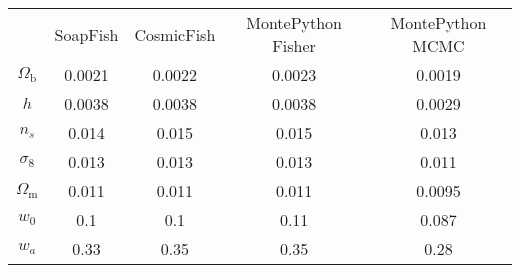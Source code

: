 \begin{table}
\centering
\begin{tabular}{|c|c|c|c|c|}
 & SoapFish & CosmicFish & MontePython Fisher & MontePython MCMC \\
$\Omega_\mathrm{b}$ & 0.0021 & 0.0022 & 0.0023 & 0.0019 \\
$h$ & 0.0038 & 0.0038 & 0.0038 & 0.0029 \\
$n_s$ & 0.014 & 0.015 & 0.015 & 0.013 \\
$\sigma_8$ & 0.013 & 0.013 & 0.013 & 0.011 \\
$\Omega_\mathrm{m}$ & 0.011 & 0.011 & 0.011 & 0.0095 \\
$w_0$ & 0.1 & 0.1 & 0.11 & 0.087 \\
$w_a$ & 0.33 & 0.35 & 0.35 & 0.28 \\
\end{tabular}
\end{table}
